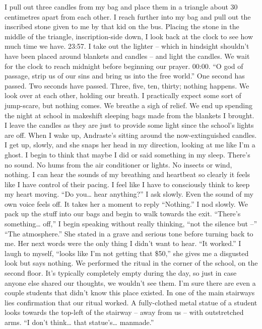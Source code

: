 \documentclass[a4paper, 12pt]{book}
\newcommand\tab[1][1cm]{\hspace*{#1}}
\begin{document}
\newline
\tab
I pull out three candles from my bag and place them in a triangle about 30 centimetres apart from each other. I reach further into my bag and pull out the inscribed stone given to me by that kid on the bus. Placing the stone in the middle of the triangle, inscription-side down, I look back at the clock to see how much time we have. 23:57. I take out the lighter – which in hindsight shouldn’t have been placed around blankets and candles – and light the candles. We wait for the clock to reach midnight before beginning our prayer. 00:00. “O god of passage, strip us of our sins and bring us into the free world.” One second has passed. Two seconds have passed. Three, five, ten, thirty; nothing happens. We look over at each other, holding our breath. I practically expect some sort of jump-scare, but nothing comes. We breathe a sigh of relief. We end up spending the night at school in makeshift sleeping bags made from the blankets I brought. I leave the candles as they are just to provide some light since the school’s lights are off.
\newline
\tab
When I wake up, Andraste’s sitting around the now-extinguished candles. I get up, slowly, and she snaps her head in my direction, looking at me like I’m a ghost. I begin to think that maybe I did or said something in my sleep.
\newline
\tab
There’s no sound. No hums from the air conditioner or lights. No insects or wind, nothing. I can hear the sounds of my breathing and heartbeat so clearly it feels like I have control of their pacing. I feel like I have to consciously think to keep my heart moving. “Do you… hear anything?” I ask slowly. Even the sound of my own voice feels off.
\newline
\tab
It takes her a moment to reply “Nothing.” I nod slowly.
\newline
\tab
We pack up the stuff into our bags and begin to walk towards the exit. “There’s something… off,” I begin speaking without really thinking, “not the silence but –”
\newline
\tab
“The atmosphere.” She stated in a grave and serious tone before turning back to me. Her next words were the only thing I didn’t want to hear. “It worked.”
\newline
\tab
I laugh to myself, “looks like I’m not getting that \$50,” she gives me a disgusted look but says nothing.
\newline
\tab
We performed the ritual in the corner of the school, on the second floor. It’s typically completely empty during the day, so just in case anyone else shared our thoughts, we wouldn’t see them. I’m sure there are even a couple students that didn’t know this place existed. In one of the main stairways lies confirmation that our ritual worked. A fully-clothed metal statue of a student looks towards the top-left of the stairway – away from us – with outstretched arms. “I don’t think… that statue’s… manmade.”
\end{document}
